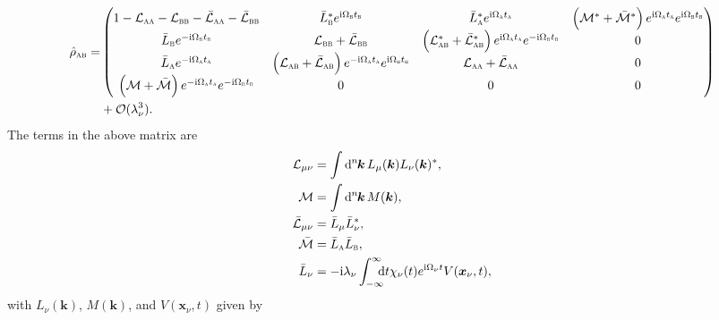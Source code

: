\documentclass[pra,nofootinbib,floats,aps,twocolumn,tightenlines,superscriptaddress]{revtex4-1}
\renewcommand*\d[2][]{%
	\mathrm{d}%
	\ifx\relax#1\relax\else
	\rule{-0.02em}{1.5ex}^{#1}\rule{0.08em}{0ex}\!
	\fi
	#2\,
}
\newcommand{\ii}{\mathrm{i}}
\newcommand{\rhoab}{\hat{\rho}_\textsc{ab}}
\begin{document}
\begin{align}
\label{eq:rho_ab_pert2}
	\rhoab
	=&
	\begin{pmatrix}
		1-\mathcal{L}_\textsc{aa}-\mathcal{L}_\textsc{bb} -\bar{\mathcal{L}}_\textsc{aa}-\bar{\mathcal{L}}_\textsc{bb} & \bar{L}_\textsc{b}^* e^{\ii\Omega_\textsc{b}t_\textsc{b}} & \bar{L}_\textsc{a}^* e^{\ii\Omega_\textsc{a}t_\textsc{a}} & \left(\mathcal{M}^* +\bar{\mathcal{M}}^*\right) e^{\ii\Omega_\textsc{a}t_\textsc{a}} e^{\ii\Omega_\textsc{b}t_\textsc{b}}
		\\
		\bar{L}_\textsc{b} e^{-\ii\Omega_\textsc{b}t_\textsc{b}} & \mathcal{L}_\textsc{bb} +\bar{\mathcal{L}}_\textsc{bb} & \left(\mathcal{L}_\textsc{ab}^* +\bar{\mathcal{L}}_\textsc{ab}^*\right) e^{\ii\Omega_\textsc{a}t_\textsc{a}} e^{-\ii\Omega_\textsc{b}t_\textsc{b}} & 0 \\
		\bar{L}_\textsc{a} e^{-\ii\Omega_\textsc{a}t_\textsc{a}} & \left(\mathcal{L}_\textsc{ab} +\bar{\mathcal{L}}_\textsc{ab}\right) e^{-\ii\Omega_\textsc{a}t_\textsc{a}} e^{\ii\Omega_\textsc{b}t_\textsc{b}}& \mathcal{L}_\textsc{aa} +\bar{\mathcal{L}}_\textsc{aa} & 0 \\
		\left(\mathcal{M} +\bar{\mathcal{M}}\right) e^{-\ii\Omega_\textsc{a}t_\textsc{a}} e^{-\ii\Omega_\textsc{b}t_\textsc{b}} & 0 & 0 & 0
	\end{pmatrix}
	\notag\\
	&+\mathcal{O}(\lambda_\nu^3).
\end{align}
The terms in the above matrix are
\begin{align}
\label{eq:L_mu_nu}
	\mathcal{L}_{\mu\nu}
	&=
	\int\d[n]{\bm{k}}L_\mu(\bm{k})L_\nu(\bm{k})^*,
	\\
\label{eq:M}
	\mathcal{M}
	&=
	\int\d[n]{\bm{k}}M(\bm{k}),
	\\
\label{eq:L_mu_nu_bar}
	\bar{\mathcal{L}}_{\mu\nu}
	&=
	\bar{L}_\mu\bar{L}_\nu^*,
	\\
\label{eq:M_bar}
	\bar{\mathcal{M}}
	&=
	\bar{L}_\textsc{a}
	\bar{L}_\textsc{b},
	\\
\label{eq:L_nu_bar}
	\bar{L}_\nu
	&=
	-\ii\lambda_\nu
	\int_{-\infty}^{\infty}\!\!\!\!\dif t			\chi_\nu(t)e^{\ii\Omega_\nu t}V(\bm{x}_\nu,t),
\end{align}
with $L_\nu(\bm{k})$, $M(\bm{k})$, and $V(\bm{x}_\nu,t)$ given by
\end{document}
